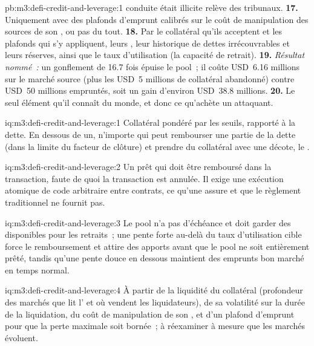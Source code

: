 \begin{solution}{pb:m3:defi-credit-and-leverage:1}
conduite était illicite relève des tribunaux. \textbf{17.} Uniquement avec des plafonds d'emprunt calibrés sur le coût de manipulation des sources de son , ou pas du tout. \textbf{18.} Par le
collatéral qu'ils acceptent et les plafonds qui s'y appliquent, leurs , leur historique de dettes irrécouvrables et leurs réserves, ainsi que le taux d'utilisation (la capacité de retrait). \textbf{19.}
\emph{Résultat nommé~:} un gonflement de 16.7 fois épuise le pool~; il coûte USD~6.16 millions sur le marché source (plus les USD~5 millions de collatéral
abandonné) contre USD~50 millions empruntés, soit un gain d'environ USD~38.8 millions. \textbf{20.} Le seul élément qu'il connaît du monde, et donc ce
qu'achète un attaquant.
\end{solution}

\begin{solution}{iq:m3:defi-credit-and-leverage:1}
Collatéral pondéré par les seuils, rapporté à la dette. En dessous de un, n'importe qui peut rembourser une partie de la dette (dans la limite du facteur de clôture) et prendre du collatéral avec une décote, le
.
\end{solution}

\begin{solution}{iq:m3:defi-credit-and-leverage:2}
Un prêt qui doit être remboursé dans la transaction, faute de quoi la transaction est annulée. Il exige une exécution atomique de code arbitraire entre contrats, ce
qu'une  assure et que le règlement traditionnel ne fournit pas.
\end{solution}

\begin{solution}{iq:m3:defi-credit-and-leverage:3}
Le pool n'a pas d'échéance et doit garder des  disponibles pour les retraits~; une pente forte au-delà du taux d'utilisation cible force le remboursement et attire des apports
avant que le pool ne soit entièrement prêté, tandis qu'une pente douce en dessous maintient des emprunts bon marché en temps normal.
\end{solution}

\begin{solution}{iq:m3:defi-credit-and-leverage:4}
À partir de la liquidité du collatéral (profondeur des marchés que lit l' et où vendent les liquidateurs), de sa volatilité sur la durée de la liquidation, du
coût de manipulation de son , et d'un plafond d'emprunt pour que la perte maximale soit bornée~; à réexaminer à mesure que les marchés évoluent.
\end{solution}

